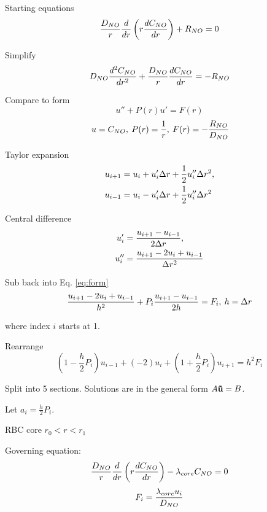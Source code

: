 \documentclass[8pt, a4paper]{article}
\begin{document}
  Starting equations
  \begin{equation}
  \frac{D_{NO}}{r} \frac{d}{dr} \left (r \frac{dC_{NO}}{dr} \right) + R_{NO} = 0
  \end{equation}
  
  Simplify
  \begin{equation}
  D_{NO} \frac{d^2C_{NO}}{dr^2} + \frac{D_{NO}}{r} \frac{dC_{NO}}{dr} = - R_{NO}
  \end{equation}
  
  Compare to form
  \begin{equation} \label{eq:form}
  u''+P(r)u'=F(r)
  \end{equation}
  \begin{equation}
  \:u=C_{NO},\:P(r)=\frac{1}{r},\:F(r)=-\frac{R_{NO}}{D_{NO}}
  \end{equation}
  
  Taylor expansion
  \begin{align*}
  u_{i+1}&=u_i+u_i'\Delta r+\frac{1}{2}u_i''\Delta r^2,\\
  u_{i-1}&=u_i-u_i'\Delta r+\frac{1}{2}u_i''\Delta r^2
  \end{align*}
  
  Central difference
  \begin{align*}
  u_i'&=\frac{u_{i+1}-u_{i-1}}{2\Delta r},\\
  u_i''&=\frac{u_{i+1}-2u_i+u_{i-1}}{\Delta r^2}
  \end{align*}
  
  Sub back into Eq. \eqref{eq:form}
  \begin{equation}
  \frac{u_{i+1}-2u_i+u_{i-1}}{h^2}+P_i\frac{u_{i+1}-u_{i-1}}{2h}=F_i,\:h=\Delta r
  \end{equation}
  
  where index $i$ starts at 1. 
  
  Rearrange
  \begin{equation}
  \left (1-\frac{h}{2}P_i \right)u_{i-1}+(-2)u_i+\left (1+\frac{h}{2}P_i 
  \right)u_{i+1}=h^2F_i
  \end{equation}

  Split into 5 sections. Solutions are in the general form $A\mathbf{\vec{u}}=B$.
  
  Let  $a_i=\frac{h}{2}P_i$.

  RBC core $r_0 < r < r_1$
  
  Governing equation:
  \begin{equation*}
  \frac{D_{NO}}{r}\frac{d}{dr}\left(r\frac{dC_{NO}}{dr}\right)-\lambda_{core}C_{NO}=0
  \end{equation*}
  \begin{equation*}
  F_i = \frac{\lambda_{core}u_i}{D_{NO}}
  \end{equation*}
  
\end{document}
